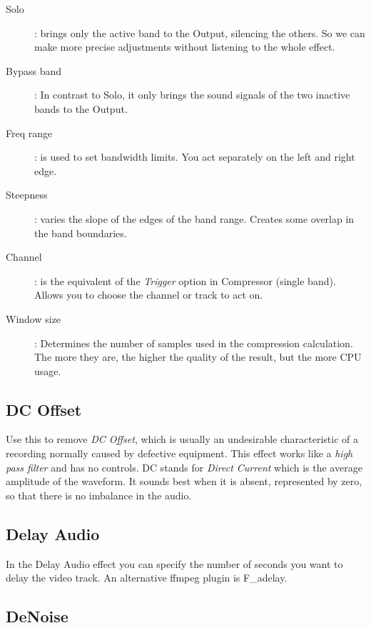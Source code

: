 \begin{description}
	\item[Solo]: brings only the active band to the Output, silencing the others. So we can make more precise adjustments without listening to the whole effect.
	\item[Bypass band]: In contrast to Solo, it only brings the sound signals of the two inactive bands to the Output.
	\item[Freq range]: is used to set bandwidth limits. You act separately on the left and right edge.
	\item[Steepness]: varies the slope of the edges of the band range. Creates some overlap in the band boundaries.
	\item[Channel]: is the equivalent of the \textit{Trigger} option in Compressor (single band). Allows you to choose the channel or track to act on.
	\item[Window size]: Determines the number of samples used in the compression calculation. The more they are, the higher the quality of the result, but the more CPU usage.
\end{description}

\subsection{DC Offset}%
\label{sub:dc_offset}

Use this to remove \textit{DC Offset}, which is usually an undesirable characteristic of a recording normally caused by defective equipment. This effect works like a \textit{high pass filter} and has no controls. DC stands for \textit{Direct Current} which is the average amplitude of the waveform. It sounds best when it is absent, represented by zero, so that there is no imbalance in the audio.

\subsection{Delay Audio}%
\label{sub:delay_audio}

In the Delay Audio effect you can specify the number of seconds you want to delay the video track.
An alternative ffmpeg plugin is F\_adelay.

\subsection{DeNoise}%
\label{sub:denoise}

